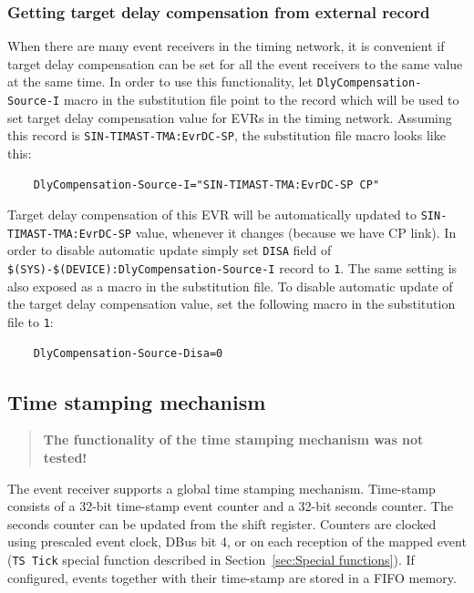 \documentclass[12pt,a4paper]{article}
\begin{document}
\subsubsection{Getting target delay compensation from external record}
When there are many event receivers in the timing network, it is convenient if target delay compensation can be set for all the event receivers to the same value at the same time. In order to use this functionality, let \texttt{DlyCompensation-Source-I} macro in the substitution file point to the record which will be used to set target delay compensation value for EVRs in the timing network. Assuming this record is \texttt{SIN-TIMAST-TMA:EvrDC-SP}, the substitution file macro looks like this:
\begin{verbatim}
	DlyCompensation-Source-I="SIN-TIMAST-TMA:EvrDC-SP CP"
\end{verbatim}
Target delay compensation of this EVR will be automatically updated to \texttt{SIN-TIMAST-TMA:EvrDC-SP} value, whenever it changes (because we have CP link). In order to disable automatic update simply set \texttt{DISA} field of \newline\texttt{\$(SYS)-\$(DEVICE):DlyCompensation-Source-I} record to \texttt{1}. The same setting is also exposed as a macro in the substitution file. To disable automatic update of the target delay compensation value, set the following macro in the substitution file to \texttt{1}:
\begin{verbatim}
	DlyCompensation-Source-Disa=0
\end{verbatim}

\subsection{Time stamping mechanism}\label{sec:Time stamping mechanism}
\begin{quote}
\textbf{The functionality of the time stamping mechanism was not tested!}
\end{quote}
The event receiver supports a global time stamping mechanism. Time-stamp consists of a 32-bit time-stamp event counter and a 32-bit seconds counter. The seconds counter can be updated from the
shift register. Counters are clocked using prescaled event clock, DBus bit 4, or on each reception of the mapped event (\texttt{TS Tick} special function described in Section~\ref{sec:Special functions}). If configured, events together with their time-stamp are stored in a FIFO memory.
\end{document}
